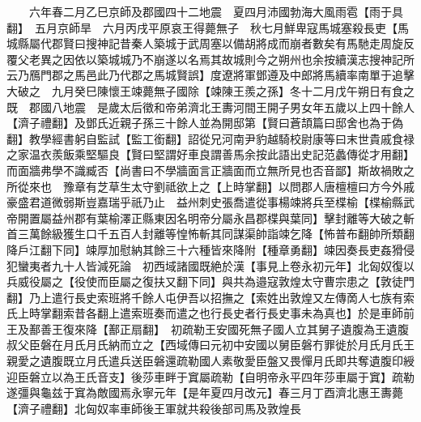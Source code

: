 　　六年春二月乙巳京師及郡國四十二地震　夏四月沛國勃海大風雨雹【雨于具翻】　五月京師旱　六月丙戌平原哀王得薨無子　秋七月鮮卑寇馬城塞殺長吏【馬城縣屬代郡賢曰搜神記昔秦人築城于武周塞以備胡將成而崩者數矣有馬馳走周旋反覆父老異之因依以築城城乃不崩遂以名焉其故城則今之朔州也余按續漢志搜神記所云乃鴈門郡之馬邑此乃代郡之馬城賢誤】度遼將軍鄧遵及中郎將馬續率南單于追擊大破之　九月癸巳陳懷王竦薨無子國除【竦陳王羨之孫】冬十二月戊午朔日有食之既　郡國八地震　是歲太后徵和帝弟濟北王夀河間王開子男女年五歲以上四十餘人【濟子禮翻】及鄧氏近親子孫三十餘人並為開邸第【賢曰蒼頡篇曰邸舍也為于偽翻】教學經書躬自監試【監工銜翻】詔從兄河南尹豹越騎校尉康等曰末世貴戚食禄之家温衣羨飯乘堅驅良【賢曰堅謂好車良謂善馬余按此語出史記范蠡傳從才用翻】而面牆弗學不識臧否【尚書曰不學牆面言正牆面而立無所見也否音鄙】斯故禍敗之所從來也　豫章有芝草生太守劉祗欲上之【上時掌翻】以問郡人唐檀檀曰方今外戚豪盛君道微弱斯豈嘉瑞乎祇乃止　益州刺史張喬遣從事楊竦將兵至楪榆【楪榆縣武帝開置屬益州郡有葉榆澤正縣東因名明帝分屬永昌郡楪與葉同】擊封離等大破之斬首三萬餘級獲生口千五百人封離等惶怖斬其同謀渠帥詣竦乞降【怖普布翻帥所類翻降戶江翻下同】竦厚加慰納其餘三十六種皆來降附【種章勇翻】竦因奏長吏姦猾侵犯蠻夷者九十人皆減死論　初西域諸國既絶於漢【事見上卷永初元年】北匈奴復以兵威役屬之【役使而臣屬之復扶又翻下同】與共為邉寇敦煌太守曹宗患之【敦徒門翻】乃上遣行長史索班將千餘人屯伊吾以招撫之【索姓出敦煌又左傳啇人七族有索氏上時掌翻索昔各翻上遣索班奏而遣之也行長史者行長史事未為真也】於是車師前王及鄯善王復來降【鄯正扇翻】　初疏勒王安國死無子國人立其舅子遺腹為王遺腹叔父臣磐在月氏月氏納而立之【西域傳曰元初中安國以舅臣磐冇罪徙於月氏月氏王親愛之遺腹既立月氏遣兵送臣磐還疏勒國人素敬愛臣盤又畏憚月氏即共奪遺腹印綬迎臣磐立以為王氏音支】後莎車畔于窴屬疏勒【自明帝永平四年莎車屬于窴】疏勒遂彊與龜兹于窴為敵國焉永寧元年【是年夏四月改元】春三月丁酉濟北惠王夀薨【濟子禮翻】北匈奴率車師後王軍就共殺後部司馬及敦煌長

